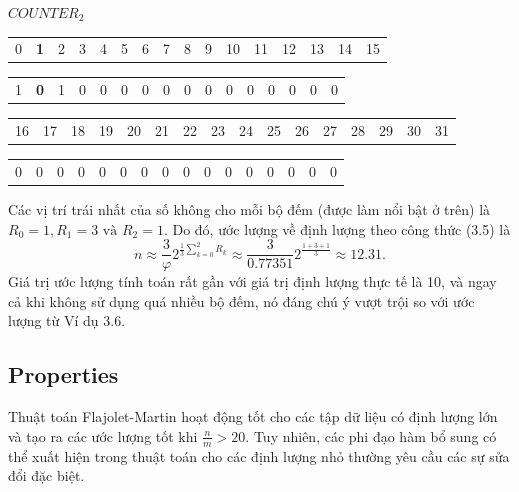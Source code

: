 \documentclass[a4paper,13pt]{article}
\theoremstyle{mytheor}
\begin{document}
\begin{mdframed}
    \vspace{0.25cm}
    $COUNTER_2$
    \begin{center}
        \begin{tabular}{p{0.4cm}p{0.4cm}p{0.4cm}p{0.4cm}p{0.4cm}p{0.4cm}p{0.4cm}p{0.4cm}p{0.4cm}p{0.4cm}p{0.4cm}p{0.4cm}p{0.4cm}p{0.4cm}p{0.4cm}p{0.4cm}}
            0 & \textbf{1} & 2 & 3 & 4 & 5 & 6 & 7 & 8 & 9 & 10 & 11 & 12 & 13 & 14 & 15 %
        \end{tabular}
        \begin{tabular}{|p{0.4cm}|p{0.4cm}|p{0.4cm}|p{0.4cm}|p{0.4cm}|p{0.4cm}|p{0.4cm}|p{0.4cm}|p{0.4cm}|p{0.4cm}|p{0.4cm}|p{0.4cm}|p{0.4cm}|p{0.4cm}|p{0.4cm}|p{0.4cm}|}
            \hline
            1 & \textbf{0} & 1 & 0 & 0 & 0 & 0 & 0 & 0 & 0 & 0 & 0 & 0 & 0 & 0 & 0 \\ \cline{1-16} %
        \end{tabular}
        \begin{tabular}{p{0.4cm}p{0.4cm}p{0.4cm}p{0.4cm}p{0.4cm}p{0.4cm}p{0.4cm}p{0.4cm}p{0.4cm}p{0.4cm}p{0.4cm}p{0.4cm}p{0.4cm}p{0.4cm}p{0.4cm}p{0.4cm}}
            16 & 17 & 18 & 19 & 20 & 21 & 22 & 23 & 24 & 25 & 26 & 27 & 28 & 29 & 30 & 31 %
        \end{tabular}
        \begin{tabular}{|p{0.4cm}|p{0.4cm}|p{0.4cm}|p{0.4cm}|p{0.4cm}|p{0.4cm}|p{0.4cm}|p{0.4cm}|p{0.4cm}|p{0.4cm}|p{0.4cm}|p{0.4cm}|p{0.4cm}|p{0.4cm}|p{0.4cm}|p{0.4cm}|}
            \hline
            0 & 0 & 0 & 0 & 0 & 0 & 0 & 0 & 0 & 0 & 0 & 0 & 0 & 0 & 0 & 0 \\ \cline{1-16} %
        \end{tabular}
    \end{center}

    Các vị trí trái nhất của số không cho mỗi bộ đếm (được làm nổi bật ở trên) là\\
    $R_0 = 1, R_1 = 3 \text{ và } R_2 = 1$. Do đó, ước lượng về định lượng theo công thức (3.5) là
    \[
        n \approx \frac{3}{\varphi}2^{\frac{1}{3}\sum\limits_{k=0}^{2}R_k} \approx \frac{3}{0.77351}2^{\frac{1+3+1}{3}} \approx 12.31.
    \]
    Giá trị ước lượng tính toán rất gần với giá trị định lượng thực tế là 10, và ngay cả khi không sử dụng quá nhiều bộ đếm, 
    nó đáng chú ý vượt trội so với ước lượng từ Ví dụ 3.6.
    \vspace{0.25cm}
\end{mdframed}
\subsection*{Properties}
Thuật toán Flajolet-Martin hoạt động tốt cho các tập dữ liệu có định lượng lớn và tạo ra các ước lượng tốt khi $\frac{n}{m} > 20$. Tuy nhiên, 
các phi đạo hàm bổ sung có thể xuất hiện trong thuật toán cho các định lượng nhỏ thường yêu cầu các sự sửa đổi đặc biệt.
\end{document}

